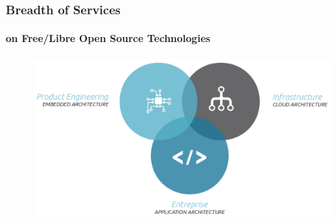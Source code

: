 \begin{frame}
	\frametitle{Breadth of Services}
	\framesubtitle{on Free/Libre Open Source Technologies}
	\begin{figure}
		\includegraphics[width=11cm]{../pics/SFL-3-areas}
	\end{figure}
\end{frame}




